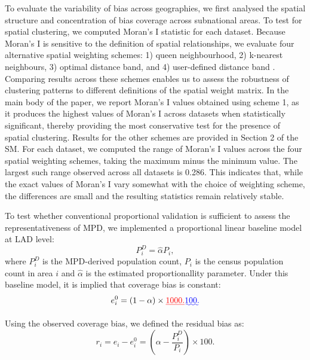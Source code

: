 \documentclass[]{rsos}%
\providecommand{\DIFadd}[1]{{\protect\color{blue}\uwave{#1}}} %
\providecommand{\DIFdel}[1]{{\protect\color{red}\sout{#1}}}                      %
\providecommand{\DIFaddbegin}{} %
\providecommand{\DIFaddend}{} %
\providecommand{\DIFdelbegin}{} %
\providecommand{\DIFdelend}{} %
\begin{document}
To evaluate the variability of bias across geographies, we first
analysed the spatial structure and concentration of bias coverage across
subnational areas. To test for spatial clustering, we computed Moran's I
statistic for each dataset. Because Moran's I is sensitive to the
definition of spatial relationships, we evaluate four alternative
spatial weighting schemes: 1) queen neighbourhood, 2) k-nearest
neighbours, 3) optimal distance band, and 4) user-defined distance band
\citep{rey2023}. Comparing results across these schemes enables us to assess
the robustness of clustering patterns to different definitions of the
spatial weight matrix. In the main body of the paper, we report Moran's
I values obtained using scheme 1, as it produces the highest values of
Moran's I across datasets when statistically significant, thereby
providing the most conservative test for the presence of spatial
clustering. Results for the other schemes are provided in Section 2 of
the SM. For each dataset, we computed the range of Moran's I values
across the four spatial weighting schemes, taking the maximum minus the
minimum value. The largest such range observed across all datasets is
0.286. This indicates that, while the exact values of Moran's I vary
somewhat with the choice of weighting scheme, the differences are small
and the resulting statistics remain relatively stable.

To test whether conventional proportional validation is sufficient to
assess the representativeness of MPD, we implemented a proportional
linear baseline model at LAD level: \begin{equation}
P_i^D = \hat{\alpha} P_i,
\end{equation} where \(P_i^D\) is the MPD-derived population count, \(P_i\)
is the census population count in area \(i\) and \(\hat{\alpha}\) is the
estimated proportionallity parameter. Under this baseline model, it is
implied that coverage bias is constant: \begin{equation}
e^0_i = (1-\alpha)\times \DIFdelbegin \DIFdel{1000.
}\DIFdelend \DIFaddbegin \DIFadd{100.
}\DIFaddend \end{equation}

Using the observed coverage bias, we defined the residual bias as:
\begin{equation}\label{eq:residual}
r_i = e_i - e_i^0 = (\alpha - \dfrac{P_i^D}{P_i})\times 100.
\end{equation}
\end{document}
